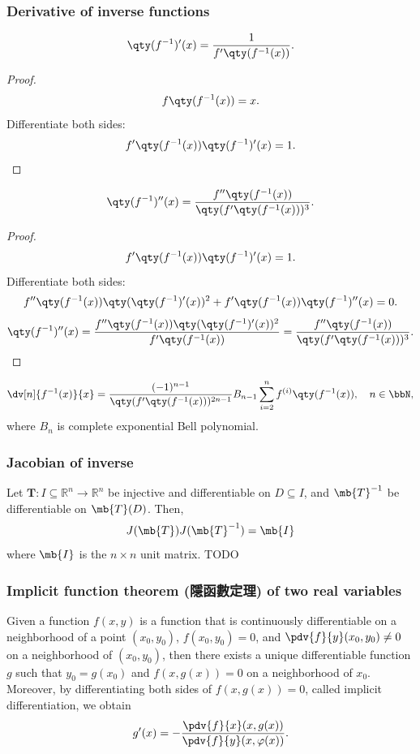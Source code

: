 \documentclass[a4paper,12pt]{report}
\begin{document}
\begin{itemize}
\begin{itemize}
\subsubsection{Derivative of inverse functions}
\[\qty(f^{-1})'(x)=\frac{1}{f'\qty(f^{-1}(x))}.\]
\begin{proof}
\[f\qty(f^{-1}(x))=x.\]
Differentiate both sides:
\[f'\qty(f^{-1}(x))\qty(f^{-1})'(x)=1.\]
\end{proof}
\[\qty(f^{-1})''(x)=\frac{f''\qty(f^{-1}(x))}{\qty(f'\qty(f^{-1}(x)))^3}.\]
\begin{proof}
\[f'\qty(f^{-1}(x))\qty(f^{-1})'(x)=1.\]
Differentiate both sides:
\[f''\qty(f^{-1}(x))\qty(\qty(f^{-1})'(x))^2+f'\qty(f^{-1}(x))\qty(f^{-1})''(x)=0.\]
\[\qty(f^{-1})''(x)=\frac{f''\qty(f^{-1}(x))\qty(\qty(f^{-1})'(x))^2}{f'\qty(f^{-1}(x))}=\frac{f''\qty(f^{-1}(x))}{\qty(f'\qty(f^{-1}(x)))^3}.\]
\end{proof}
\[\dv[n]{f^{-1}(x)}{x}=\frac{(-1)^{n-1}}{\qty(f'\qty(f^{-1}(x)))^{2n-1}}B_{n-1}\sum_{i=2}^{n}f^{(i)}\qty(f^{-1}(x)),\quad n\in\bbN,\]
where $B_n$ is complete exponential Bell polynomial.
\subsubsection{Jacobian of inverse}
Let $\mathbf{T}\colon I\subseteq\mathbb{R}^n\to\mathbb{R}^n$ be injective and differentiable on $D\subseteq I$, and $\mb{T}^{-1}$ be differentiable on $\mb{T}(D)$. Then,
\[J(\mb{T})J(\mb{T}^{-1})=\mb{I}\]
where $\mb{I}$ is the $n\times n$ unit matrix.
\bpr
TODO
\epr
\subsubsection{Implicit function theorem (隱函數定理) of two real variables}
Given a function $f(x,y)$ is a function that is continuously differentiable on a neighborhood of a point $(x_0,y_0)$, $f(x_0,y_0)=0$, and $\pdv{f}{y}(x_0,y_0)\neq 0$ on a neighborhood of $(x_0,y_0)$, then there exists a unique differentiable function $g$ such that $y_0=g(x_0)$ and $f(x,g(x))=0$ on a neighborhood of $x_0$. Moreover, by differentiating both sides of $f(x,g(x))=0$, called implicit differentiation, we obtain
\[g'(x)=-\frac{\pdv{f}{x}(x,g(x))}{\pdv{f}{y}(x,\varphi(x))}.\]

\end{itemize}
\end{itemize}
\end{document}

